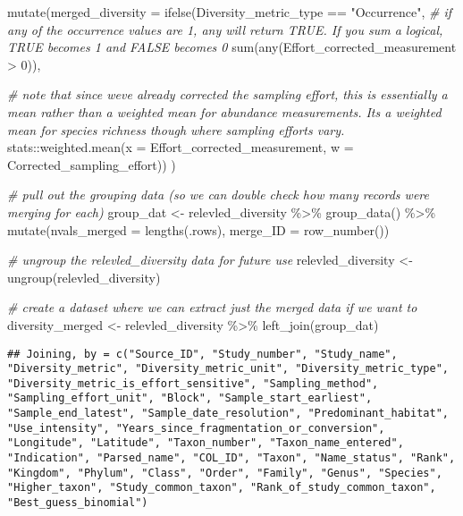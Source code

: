 \documentclass[
]{article}
\newenvironment{Shaded}{\begin{snugshade}}{\end{snugshade}}
\newcommand{\AttributeTok}[1]{\textcolor[rgb]{0.77,0.63,0.00}{#1}}
\newcommand{\CommentTok}[1]{\textcolor[rgb]{0.56,0.35,0.01}{\textit{#1}}}
\newcommand{\DecValTok}[1]{\textcolor[rgb]{0.00,0.00,0.81}{#1}}
\newcommand{\FunctionTok}[1]{\textcolor[rgb]{0.00,0.00,0.00}{#1}}
\newcommand{\NormalTok}[1]{#1}
\newcommand{\OtherTok}[1]{\textcolor[rgb]{0.56,0.35,0.01}{#1}}
\newcommand{\SpecialCharTok}[1]{\textcolor[rgb]{0.00,0.00,0.00}{#1}}
\newcommand{\StringTok}[1]{\textcolor[rgb]{0.31,0.60,0.02}{#1}}
\begin{document}
\begin{Shaded}
\begin{Highlighting}[]
  \FunctionTok{mutate}\NormalTok{(}\AttributeTok{merged\_diversity =} 
           \FunctionTok{ifelse}\NormalTok{(Diversity\_metric\_type }\SpecialCharTok{==} \StringTok{"Occurrence"}\NormalTok{,}
                  \CommentTok{\# if any of the occurrence values are 1, \textasciigrave{}any\textasciigrave{} will return TRUE. If you sum a logical, TRUE becomes 1 and FALSE becomes 0}
                  \FunctionTok{sum}\NormalTok{(}\FunctionTok{any}\NormalTok{(Effort\_corrected\_measurement }\SpecialCharTok{\textgreater{}} \DecValTok{0}\NormalTok{)),}
                  
                  \CommentTok{\# note that since we\textquotesingle{}ve already corrected the sampling effort, this is essentially a mean rather than a weighted mean for abundance measurements. It\textquotesingle{}s a weighted mean for species richness though where sampling efforts vary.}
\NormalTok{                  stats}\SpecialCharTok{::}\FunctionTok{weighted.mean}\NormalTok{(}\AttributeTok{x =}\NormalTok{ Effort\_corrected\_measurement,}
                                       \AttributeTok{w =}\NormalTok{ Corrected\_sampling\_effort))}
\NormalTok{         )}

\CommentTok{\# pull out the grouping data (so we can double check how many records we\textquotesingle{}re merging for each)}
\NormalTok{group\_dat }\OtherTok{\textless{}{-}}\NormalTok{ relevled\_diversity }\SpecialCharTok{\%\textgreater{}\%} 
  \FunctionTok{group\_data}\NormalTok{() }\SpecialCharTok{\%\textgreater{}\%}
  \FunctionTok{mutate}\NormalTok{(}\AttributeTok{nvals\_merged =} \FunctionTok{lengths}\NormalTok{(.rows),}
         \AttributeTok{merge\_ID =} \FunctionTok{row\_number}\NormalTok{())}

\CommentTok{\# ungroup the relevled\_diversity data for future use}
\NormalTok{relevled\_diversity }\OtherTok{\textless{}{-}} \FunctionTok{ungroup}\NormalTok{(relevled\_diversity)}

\CommentTok{\# create a dataset where we can extract just the merged data if we want to}
\NormalTok{diversity\_merged }\OtherTok{\textless{}{-}}\NormalTok{ relevled\_diversity }\SpecialCharTok{\%\textgreater{}\%}
  \FunctionTok{left\_join}\NormalTok{(group\_dat)}
\end{Highlighting}
\end{Shaded}

\begin{verbatim}
## Joining, by = c("Source_ID", "Study_number", "Study_name", "Diversity_metric", "Diversity_metric_unit", "Diversity_metric_type", "Diversity_metric_is_effort_sensitive", "Sampling_method", "Sampling_effort_unit", "Block", "Sample_start_earliest", "Sample_end_latest", "Sample_date_resolution", "Predominant_habitat", "Use_intensity", "Years_since_fragmentation_or_conversion", "Longitude", "Latitude", "Taxon_number", "Taxon_name_entered", "Indication", "Parsed_name", "COL_ID", "Taxon", "Name_status", "Rank", "Kingdom", "Phylum", "Class", "Order", "Family", "Genus", "Species", "Higher_taxon", "Study_common_taxon", "Rank_of_study_common_taxon", "Best_guess_binomial")
\end{verbatim}
\end{document}
